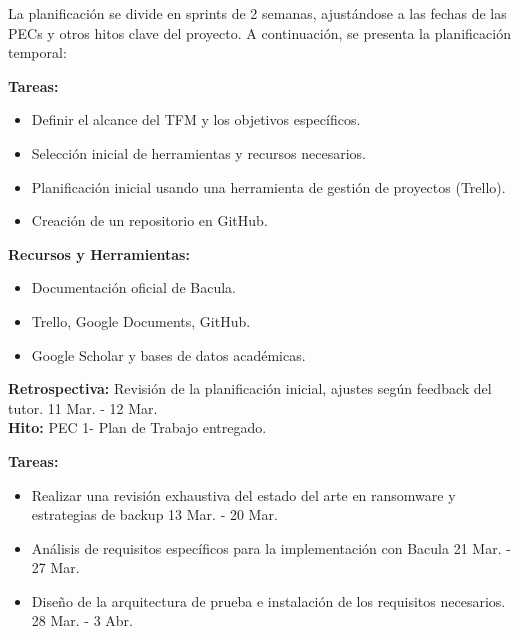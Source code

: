 La planificación se divide en sprints de 2 semanas, ajustándose a las fechas de las PECs y otros hitos clave del proyecto. A continuación, se presenta la planificación temporal: 

\begin{tcolorbox}[phasebox, title=Fases del trabajo]
    \small
    \begin{tcolorbox}[sprintbox, title=Sprint 1: Preparación y presentación del Plan de Trabajo]
        \textbf{Tareas:}
        \begin{itemize}
            \item Definir el alcance del TFM y los objetivos específicos.
            \item Selección inicial de herramientas y recursos necesarios.
            \item Planificación inicial usando una herramienta de gestión de proyectos (Trello).
            \item Creación de un repositorio en GitHub.
        \end{itemize}
        \textbf{Recursos y Herramientas:}
        \begin{itemize}
            \item Documentación oficial de Bacula.
            \item Trello, Google Documents, GitHub.
            \item Google Scholar y bases de datos académicas.
        \end{itemize}
        \textbf{Retrospectiva:} Revisión de la planificación inicial, ajustes según feedback del tutor. 11 Mar. - 12 Mar.\\
        \textbf{Hito:} PEC 1- Plan de Trabajo entregado.
    \end{tcolorbox}


    \begin{tcolorbox}[sprintbox, title= Sprint 2 y 3: Análisis de requisitos y diseño inicial.]
    
        \textbf{Tareas:}
        \begin{itemize}
            \item Realizar una revisión exhaustiva del estado del arte en ransomware y estrategias de backup 13 Mar. - 20 Mar.
            \item Análisis de requisitos específicos para la implementación con Bacula 21 Mar. - 27 Mar.
            \item Diseño de la arquitectura de prueba e instalación de los requisitos necesarios. 28 Mar. - 3 Abr.
            

\end{itemize}
\end{tcolorbox}
\end{tcolorbox}
